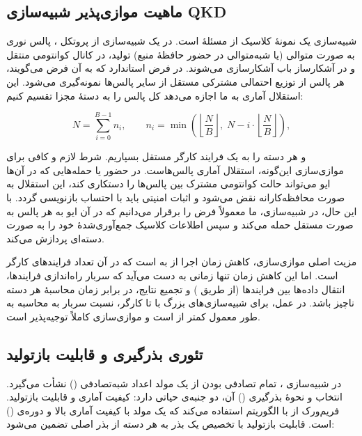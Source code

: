 \subsection{ماهیت موازی‌پذیر شبیه‌سازی QKD}

شبیه‌سازی  یک نمونۀ کلاسیک از مسئلۀ  است. در یک شبیه‌سازی  از پروتکل ،  پالس نوری به صورت متوالی (یا شبه‌متوالی در حضور حافظۀ منبع) تولید، در کانال کوانتومی منتقل و در آشکارساز باب آشکارسازی می‌شوند. در فرض استاندارد که به آن فرض  می‌گویند، هر پالس از توزیع احتمالی مشترکی مستقل از سایر پالس‌ها نمونه‌گیری می‌شود. این استقلال آماری به ما اجازه می‌دهد کل  پالس را به  دستۀ مجزا تقسیم کنیم:

\begin{equation}
	N = \sum_{i=0}^{B-1} n_i, \qquad n_i = \min\!\left( \left\lfloor \frac{N}{B} \right\rfloor,\; N - i \cdot \left\lfloor \frac{N}{B} \right\rfloor \right),
\end{equation}

\noindent و هر دسته را به یک فرایند کارگر مستقل بسپاریم. شرط لازم و کافی برای موازی‌سازی این‌گونه، استقلال آماری پالس‌هاست. در حضور  یا حمله‌هایی که در آن‌ها ایو می‌تواند حالت کوانتومی مشترک بین پالس‌ها را دستکاری کند، این استقلال به صورت محافظه‌کارانه نقض می‌شود و اثبات امنیتی باید با احتساب  بازنویسی گردد. با این حال، در شبیه‌سازی، ما معمولاً فرض  را برقرار می‌دانیم که در آن ایو به هر پالس به صورت مستقل حمله می‌کند و سپس اطلاعات کلاسیک جمع‌آوری‌شدۀ خود را به صورت دسته‌ای پردازش می‌کند.

مزیت اصلی موازی‌سازی، کاهش زمان اجرا از  به  است که در آن  تعداد فرایندهای کارگر است. اما این کاهش زمان تنها زمانی به دست می‌آید که سربار راه‌اندازی فرایندها، انتقال داده‌ها بین فرایندها (از طریق ) و تجمیع نتایج، در برابر زمان محاسبۀ هر دسته ناچیز باشد. در عمل، برای شبیه‌سازی‌های بزرگ  با  تا  کارگر، نسبت سربار به محاسبه به طور معمول کمتر از  است و موازی‌سازی کاملاً توجیه‌پذیر است.

\subsection{تئوری بذرگیری و قابلیت بازتولید}

در شبیه‌سازی ، تمام تصادفی بودن از یک مولد اعداد شبه‌تصادفی () نشأت می‌گیرد. انتخاب  و نحوۀ بذرگیری () آن، دو جنبه‌ی حیاتی دارد: کیفیت آماری و قابلیت بازتولید. فریم‌ورک  از  با الگوریتم  استفاده می‌کند که یک مولد با کیفیت آماری بالا و دوره‌ی ()  است. قابلیت بازتولید با تخصیص یک بذر  به هر دسته  از بذر اصلی  تضمین می‌شود:

